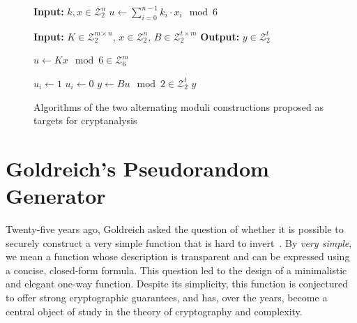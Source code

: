 \documentclass[journal=tosc,submission]{iacrtrans}
\theoremstyle{theorem}
\newcommand\Z{\mathcal{Z}}
\newcommand\cb[1]{\textcolor{red!80}{\textbf{Christina:} #1}}
\newcommand\yr[1]{\textcolor{brown!80}{\textbf{Yann:} #1}}
\begin{document}
\begin{figure}[ht]
\centering
\begin{minipage}[t]{0.47\textwidth}
\begin{algorithm}[H]
  \caption{\label{alg:bipsw}The mod-2/mod-3 wPRF} 
  \begin{algorithmic} 
    \State \textbf{Input:} $k,x \in \Z_2^n$
    \State $u \leftarrow \sum_{i=0}^{n-1} k_i \cdot x_i \mod 6$ 
      \State {} 
    \Else
      \State {}
    \EndIf
  \end{algorithmic}
\end{algorithm}
\end{minipage}
\hfill
\begin{minipage}[t]{0.47\textwidth}
\begin{algorithm}[H]
  \caption{\label{alg:dgh_mod6}Mod-6 version of the \cite{C:DGHIKS21} construction}
  \begin{algorithmic}
    \State \textbf{Input:} $K \in \Z_2^{m \times n}$, $x \in \Z_2^n$, $B \in \Z_2^{t \times m}$
    \State \textbf{Output:} $y \in \Z_2^t$
    
    \State $u \gets Kx \mod 6 \in \Z_6^m$ 
    
        \State $u_i \gets 1$
      \Else
        \State $u_i \gets 0$
      \EndIf
    \EndFor
    \State $y \gets B u \mod 2 \in \Z_2^t$
     \State \Return $y$
  \end{algorithmic}
\end{algorithm}
\end{minipage}
\caption{\label{fig:bispw_alg} Algorithms of the two alternating moduli constructions proposed as targets for cryptanalysis}
\end{figure}



\section{Goldreich's Pseudorandom Generator}
\label{sec:goldreich}

Twenty-five years ago, Goldreich asked the question of whether it is possible to securely construct a very simple function that is hard to invert~\cite{DBLP:journals/eccc/ECCC-TR00-090}. By \emph{very simple}, we mean a function whose description is transparent and can be expressed using a concise, closed-form formula. This question led to the design of a minimalistic and elegant one-way function. Despite its simplicity, this function is conjectured to offer strong cryptographic guarantees, and has, over the years, become a central object of study in the theory of cryptography and complexity.  %
\end{document}
